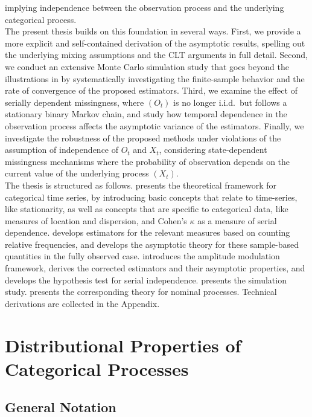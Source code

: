 ﻿\documentclass[12pt,a4paper]{scrreprt}
\theoremstyle{definition}
\begin{document}
implying independence between the observation process and the
underlying categorical process.\\
The present thesis builds on this foundation in several ways. First, 
we provide a more explicit and self-contained derivation of the 
asymptotic results, spelling out the underlying mixing assumptions and 
the CLT arguments in full detail. Second, we conduct an extensive 
Monte Carlo simulation study that goes beyond the illustrations in 
\citet{weiss2021categorical} by systematically investigating the 
finite-sample behavior and the rate of convergence of the proposed 
estimators. Third, we examine the effect of serially dependent 
missingness, where $(O_t)$ is no longer i.i.d.\ but follows a 
stationary binary Markov chain, and study how temporal dependence in 
the observation process affects the asymptotic variance of the 
estimators. Finally, we investigate the robustness of the proposed 
methods under violations of the assumption of independence of $O_t$ and $X_t$, considering 
state-dependent missingness mechanisms where the probability of 
observation depends on the current value of the underlying process 
$(X_t)$.\\
The thesis is structured as follows.  
presents the theoretical framework for categorical time series, by introducing 
basic concepts that relate to time-series, like  stationarity, as well as 
concepts that are specific to categorical data, like measures of location and 
dispersion, and Cohen's $\kappa$ as a measure of serial dependence. 
 develops estimators for the relevant measures based on counting relative frequencies, 
and develops the asymptotic theory for these sample-based quantities in the fully observed case. 
 introduces the amplitude modulation framework, 
derives the corrected estimators and their asymptotic properties, and 
develops the hypothesis test for serial independence. 
 presents the simulation study. 
 presents the corresponding theory for nominal processes. 
Technical derivations are collected in the Appendix.


\chapter{Distributional Properties of Categorical Processes}\label{chap:distributional}

\section{General Notation}
\end{document}

